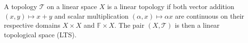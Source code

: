 A topology $\mathcal{T}$ on a linear space $X$ is a linear topology if both vector addition $(x,y) \mapsto x+y$ and scalar multiplication $(\alpha,x) \mapsto \alpha x$ are continuous on their respective domains $X \times X$ and $\mathbb{F} \times X$. The pair $(X, \mathcal{T})$ is then a linear topological space (LTS).